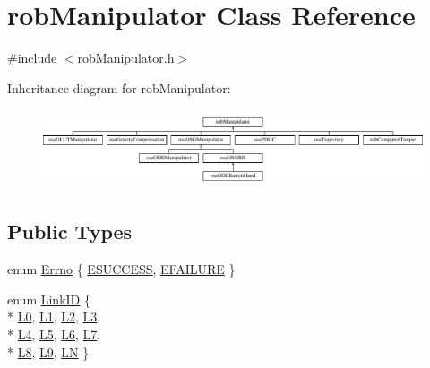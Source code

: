 \hypertarget{classrob_manipulator}{}\section{rob\+Manipulator Class Reference}
\label{classrob_manipulator}


{\ttfamily \#include $<$rob\+Manipulator.\+h$>$}

Inheritance diagram for rob\+Manipulator\+:\begin{figure}[H]
\begin{center}
\leavevmode
\includegraphics[height=2.333333cm]{d8/dc2/classrob_manipulator}
\end{center}
\end{figure}
\subsection*{Public Types}
\begin{DoxyCompactItemize}
\item 
enum \hyperlink{classrob_manipulator_a7bbb51cdb81c9c681075a9274ca0cdc0}{Errno} \{ \hyperlink{classrob_manipulator_a7bbb51cdb81c9c681075a9274ca0cdc0a4c226980d6ea8bac5c424a7d1422fc32}{E\+S\+U\+C\+C\+E\+S\+S}, 
\hyperlink{classrob_manipulator_a7bbb51cdb81c9c681075a9274ca0cdc0ab432cb0d5e98e3743f43b7d5053079ae}{E\+F\+A\+I\+L\+U\+R\+E}
 \}
\item 
enum \hyperlink{classrob_manipulator_ad3b2499e7a137e7aa0e5d3a9c6277b30}{Link\+I\+D} \{ \\*
\hyperlink{classrob_manipulator_ad3b2499e7a137e7aa0e5d3a9c6277b30a8db2978612d88b9625029a8dc8700079}{L0}, 
\hyperlink{classrob_manipulator_ad3b2499e7a137e7aa0e5d3a9c6277b30a09b660bf4983750da3f96c0841269f29}{L1}, 
\hyperlink{classrob_manipulator_ad3b2499e7a137e7aa0e5d3a9c6277b30aaa5b5f30d0cc3fd2d0ea0729ce60fb6f}{L2}, 
\hyperlink{classrob_manipulator_ad3b2499e7a137e7aa0e5d3a9c6277b30afdfab6a3ec7ece9ec932937d5984e877}{L3}, 
\\*
\hyperlink{classrob_manipulator_ad3b2499e7a137e7aa0e5d3a9c6277b30abb1585b727ddf3f5bb71a60cbf58881a}{L4}, 
\hyperlink{classrob_manipulator_ad3b2499e7a137e7aa0e5d3a9c6277b30a8e3ccf775bd8fb92c8bac84a3f835b70}{L5}, 
\hyperlink{classrob_manipulator_ad3b2499e7a137e7aa0e5d3a9c6277b30a5acb05ce8f8e46621a85ad571b0abfc9}{L6}, 
\hyperlink{classrob_manipulator_ad3b2499e7a137e7aa0e5d3a9c6277b30a06ebad2979154d92b8637ad6865c95c5}{L7}, 
\\*
\hyperlink{classrob_manipulator_ad3b2499e7a137e7aa0e5d3a9c6277b30a59b012b4594df5d7a514e1a729954345}{L8}, 
\hyperlink{classrob_manipulator_ad3b2499e7a137e7aa0e5d3a9c6277b30ae63bc29ff37d5aa09a2edfb4dc335dd0}{L9}, 
\hyperlink{classrob_manipulator_ad3b2499e7a137e7aa0e5d3a9c6277b30ae8cc0a5b766014b0550ed4b3cf8db13e}{L\+N}
 \}
\end{DoxyCompactItemize}
